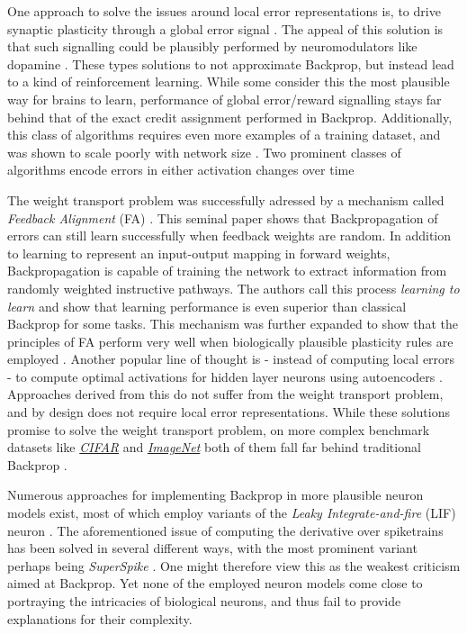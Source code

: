 One approach to solve the issues around local error representations is, to drive synaptic plasticity through a global
error signal \citeme. The appeal of this solution is that such signalling could be plausibly performed by
neuromodulators like dopamine \citep{Mazzoni1991,Seung2003,izhikevich2007solving}. These types solutions to not
approximate Backprop, but instead lead to a kind of reinforcement learning. While some consider this the most plausible
way for brains to learn, performance of global error/reward signalling stays far behind that of the exact credit
assignment performed in Backprop. Additionally, this class of algorithms requires even more examples of a training
dataset, and was shown to scale poorly with network size \citep{Werfel2003}. Two prominent classes of algorithms
encode errors in either activation changes over time \citep{}


The weight transport problem was successfully adressed by a mechanism called \textit{Feedback Alignment} (FA)
\citep{Lillicrap2014}. This seminal paper shows that Backpropagation of errors can still learn successfully when
feedback weights are random. In addition to learning to represent an input-output mapping in forward weights,
Backpropagation is capable of training the network to extract information from randomly weighted instructive pathways.
The authors call this process \textit{learning to learn} and show that learning performance is even superior than
classical Backprop for some tasks. This mechanism was further expanded to show that the principles of FA perform very
well when biologically plausible plasticity rules are employed \citep{Liao2016,Zenke2018}. Another popular line of
thought is - instead of computing local errors - to compute optimal activations for hidden layer neurons using
autoencoders \citep{Bengio2014,Lee2015,Ahmad2020}. Approaches derived from this do not suffer from the weight transport
problem, and by design does not require local error representations. While these solutions promise to solve the weight
transport problem, on more complex benchmark datasets like
\textit{\href{https://www.cs.toronto.edu/~kriz/cifar.html}{CIFAR}} and
\textit{\href{https://www.image-net.org/index.php}{ImageNet}} both of them fall far behind traditional Backprop
\citep{Bartunov2018}.

Numerous approaches for implementing Backprop in more plausible neuron models exist, most of which employ variants of
the \textit{Leaky Integrate-and-fire} (LIF) neuron \citep{Sporea2013,Lee2016,Bengio2017,Lee2020}. The aforementioned
issue of computing the derivative over spiketrains has been solved in several different ways, with the most prominent
variant perhaps being \textit{SuperSpike} \citep{Zenke2018}. One might therefore view this as the weakest criticism
aimed at Backprop. Yet none of the employed neuron models come close to portraying the intricacies of biological
neurons, and thus fail to provide explanations for their complexity.\newline


